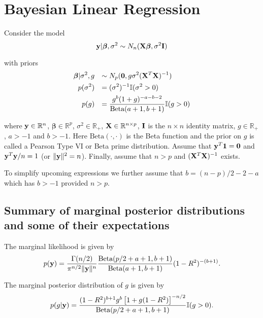 \documentclass{article}
\def\vectorfontone{\bf}
\def\vectorfonttwo{\boldsymbol}
\def\vy{{\vectorfontone y}}                      %
\def\vone{{\vectorfontone 1}}
\def\vzero{{\vectorfontone 0}}
\def\vbeta{{\vectorfonttwo \beta}}               %
\def\matrixfontone{\bf}
\def\mI{{\matrixfontone I}}                      %
\def\mX{{\matrixfontone X}}                      %
\def\bR{{\mathbb R}}                             %
\def\bI{{\mathbb I}}                             %
\def\ds{\displaystyle}
\theoremstyle{definition}
\begin{document}
	
\section{Bayesian Linear Regression}
 

Consider the model
$$
\ds \vy|\vbeta,\sigma^2 \sim N_n(\mX\vbeta,\sigma^2\mI) 
$$

\noindent with priors
\begin{equation}\label{eq:model}
\begin{array}{rl}
\ds \vbeta|\sigma^2,g   & \ds \sim N_p(\vzero,g\sigma^2(\mX^T\mX)^{-1}) \\ [1ex]
\ds p(\sigma^2) & \ds = (\sigma^2)^{-1} \bI(\sigma^2>0) \\ [1ex]
\ds p(g) & \ds = \frac{g^{b}(1 + g)^{-a-b-2}}{\mbox{Beta}(a+1,b+1)}  \bI(g>0)
\end{array}
\end{equation}

\noindent where $\vy\in\bR^n$, $\vbeta\in\bR^p$, $\sigma^2\in \bR_+$,
$\mX\in\bR^{n\times  p}$, $\mI$ is the $n\times n$ identity matrix,
$g\in \bR_+$, $a>-1$ and $b>-1$. Here $\mbox{Beta}(\cdot,\cdot)$ is the
Beta function and the prior on $g$ is called a Pearson Type VI or Beta prime
distribution. Assume that $\vy^T\vone = \vzero$ 
and $\vy^T\vy/n = 1$ (or $\|\vy\|^2 = n$). 
Finally, assume that $n>p$ and $(\mX^T\mX)^{-1}$ exists.

\medskip
\noindent To simplify upcoming expressions we further assume that
$b= (n-p)/2 - 2 - a$ which has $b>-1$ provided $n>p$.


\subsection{Summary of marginal posterior distributions and some of their expectations}

The marginal likelihood is given by
\begin{equation}\label{eq:marginal}
\ds p(\vy) 
= \frac{\Gamma(n/2) }{\pi^{n/2} \|\vy\|^n } 
\frac{\mbox{Beta}( p/2 + a + 1,b+1)}{\mbox{Beta}(a+1,b+1)}
(1 -  R^2)^{-(b+1)}.
\end{equation}

\noindent The marginal posterior distribution of $g$ is given by
\begin{equation}\label{eq:marginalOfG}
p(g|\vy) = \frac{(1 -  R^2)^{b+1} g^{b} \left[  1 + g(1 -  R^2) \right]^{-n/2}}{\mbox{Beta}(p/2 + a + 1,b+1)}  \bI(g>0).
\end{equation}
\end{document}
